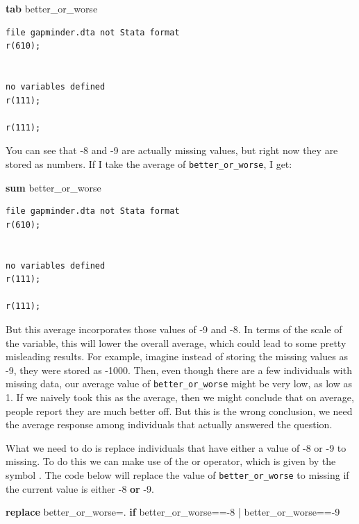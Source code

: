 \documentclass[
]{book}
\newenvironment{Shaded}{\begin{snugshade}}{\end{snugshade}}
\newcommand{\KeywordTok}[1]{\textcolor[rgb]{0.13,0.29,0.53}{\textbf{#1}}}
\newcommand{\NormalTok}[1]{#1}
\begin{document}
\begin{Shaded}
\begin{Highlighting}[]
\KeywordTok{tab}\NormalTok{ better\_or\_worse}
\end{Highlighting}
\end{Shaded}

\begin{verbatim}
file gapminder.dta not Stata format
r(610);


no variables defined
r(111);

r(111);
\end{verbatim}

You can see that -8 and -9 are actually missing values, but right now they are stored as numbers. If I take the average of \texttt{better\_or\_worse}, I get:

\begin{Shaded}
\begin{Highlighting}[]
\KeywordTok{sum}\NormalTok{ better\_or\_worse}
\end{Highlighting}
\end{Shaded}

\begin{verbatim}
file gapminder.dta not Stata format
r(610);


no variables defined
r(111);

r(111);
\end{verbatim}

But this average incorporates those values of -9 and -8. In terms of the scale of the variable, this will lower the overall average, which could lead to some pretty misleading results. For example, imagine instead of storing the missing values as -9, they were stored as -1000. Then, even though there are a few individuals with missing data, our average value of \texttt{better\_or\_worse} might be very low, as low as 1. If we naively took this as the average, then we might conclude that on average, people report they are much better off. But this is the wrong conclusion, we need the average response among individuals that actually answered the question.

What we need to do is replace individuals that have either a value of -8 or -9 to missing. To do this we can make use of the or operator, which is given by the symbol \texttt{\textbar{}}. The code below will replace the value of \texttt{better\_or\_worse} to missing if the current value is either -8 \textbf{or} -9.

\begin{Shaded}
\begin{Highlighting}[]
\KeywordTok{replace}\NormalTok{ better\_or\_worse=. }\KeywordTok{if}\NormalTok{ better\_or\_worse=={-}8 | better\_or\_worse=={-}9}
\end{Highlighting}
\end{Shaded}
\end{document}

